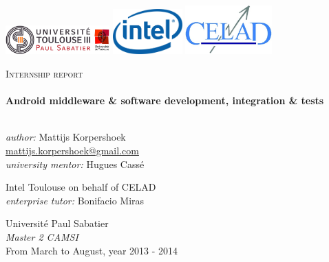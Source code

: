 \begin{titlepage}


\begin{minipage}{\textwidth}
\includegraphics[width=0.30\textwidth]{./src/img/logoups.jpg}
\hfill \includegraphics[width=0.20\textwidth]{./src/img/logointel.jpg} \hfill
\includegraphics[width=0.25\textwidth]{./src/img/logocelad.jpg}
\end{minipage}

\begin{center}

\vfill

\textsc{\LARGE Internship report}\\[0.5cm]

\titleRule \\[0.4cm]
{ \huge \bfseries Android middleware \& software development, integration \& tests}\\[0.4cm]

\titleRule \\[1.5cm]

\vfill

\begin{minipage}{0.49\textwidth}
\begin{flushleft} \large
  \emph{author:} Mattijs Korpershoek \\
\href{mailto:mattijs.korpershoek@gmail.com}{mattijs.korpershoek@gmail.com} \\
\emph{university mentor:} Hugues Cassé
\end{flushleft}
\end{minipage}
\begin{minipage}{0.49\textwidth}
\begin{flushright} \large
Intel Toulouse on behalf of CELAD \\
\emph{enterprise tutor:} Bonifacio Miras
\end{flushright}
\end{minipage}

\vfill

Université Paul Sabatier \\
\emph{Master 2 CAMSI} \\
From March to August, year 2013 - 2014

\end{center}

\end{titlepage}

